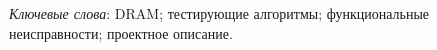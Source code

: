\thispagestyle{empty}

\emph{Ключевые слова}: DRAM; тестирующие алгоритмы; функциональные неисправности; проектное описание.

\vspace{4\parsep}






\clearpage
